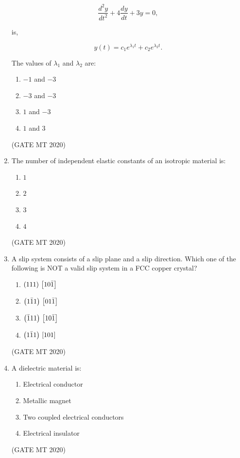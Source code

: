 \documentclass[journal, 11pt, onecolumn]{IEEEtran}
\theoremstyle{remark}
\begin{document}
\begin{enumerate}
$$
\dfrac{d^{2}y}{dt^{2}} + 4\dfrac{dy}{dt} + 3y = 0,
$$

is,  

$$
y(t) = c_{1}e^{\lambda_{1}t} + c_{2}e^{\lambda_{2}t}.
$$

The values of $\lambda_{1}$ and $\lambda_{2}$ are:  

\begin{multicols}{2}
\begin{enumerate}
\item $-1$ and $-3$  
\item $-3$ and $-3$  
\item $1$ and $-3$  
\item $1$ and $3$  
\end{enumerate}
\end{multicols}
\hfill(GATE MT 2020)

\item The number of independent elastic constants of an isotropic material is:  

\begin{multicols}{2}
\begin{enumerate}
\item $1$  
\item $2$  
\item $3$  
\item $4$  
\end{enumerate}
\end{multicols}
\hfill(GATE MT 2020)

\item A slip system consists of a slip plane and a slip direction. Which one of the following is NOT a valid slip system in a FCC copper crystal?  

\begin{multicols}{2}
\begin{enumerate}
\item $\left(111\right){}\left[10\bar{1}\right]$  
\item $\left(1\bar{1}1\right){}\left[01\bar{1}\right]$  
\item $\left(\bar{1}11\right){}\left[10\bar{1}\right]$  
\item $\left(1\bar{1}1\right){}\left[101\right]$  
\end{enumerate}
\end{multicols}
\hfill(GATE MT 2020)

\item A dielectric material is:  

\begin{multicols}{2}
\begin{enumerate}
\item Electrical conductor  
\item Metallic magnet  
\item Two coupled electrical conductors  
\item Electrical insulator  
\end{enumerate}
\end{multicols}
\hfill(GATE MT 2020)


\end{enumerate}
\end{document}
